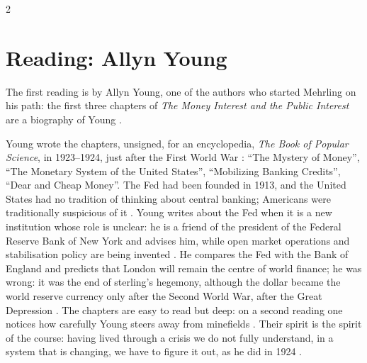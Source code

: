 \begin{paracol}{2}
\section{Reading: Allyn Young}\label{sec:fp-young}

The first reading is by Allyn Young, one of the authors who started Mehrling on his path: the first three chapters of
\emph{The Money Interest and the Public Interest} are a biography of Young .

\begin{reading}
Young wrote the chapters, unsigned, for an encyclopedia, \emph{The Book of Popular Science}, in 1923--1924, just after
the First World War : ``The Mystery of Money'', ``The Monetary System of the United States'',
``Mobilizing Banking Credits'', ``Dear and Cheap Money''. The Fed had been founded in 1913, and the United States had
no tradition of thinking about central banking; Americans were traditionally suspicious of it . Young
writes about the Fed when it is a new institution whose role is unclear: he is a friend of the president of the
Federal Reserve Bank of New York and advises him, while open market operations and stabilisation policy are being
invented . He compares the Fed with the Bank of England and predicts that London will remain the centre
of world finance; he was wrong: it was the end of sterling's hegemony, although the dollar became the world reserve
currency only after the Second World War, after the Great Depression . The chapters are
easy to read but deep: on a second reading one notices how carefully Young steers away from minefields
. Their spirit is the spirit of the course: having lived through a crisis we do not fully understand,
in a system that is changing, we have to figure it out, as he did in 1924 .


\end{reading}
\end{paracol}
